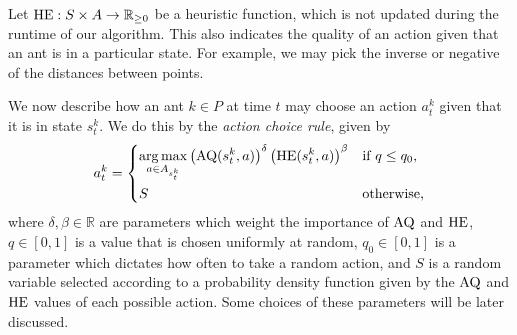 Let $\operatorname{HE}: S \times A \to \mathbb R_{\geq 0}$ be a heuristic function, which is not updated during the runtime of our algorithm. This also indicates the quality of an action given that an ant is in a particular state. For example, we may pick the inverse or negative of the distances between points.

We now describe how an ant $k \in P$ at time $t$ may choose an action $a_t^k$ given that it is in state $s_t^k$. We do this by the \emph{action choice rule}, given by
\begin{equation}
    \label{eq:action-choice-rule}
    a_t^k =
    \begin{dcases}
        \operatorname*{arg\,max}_{a \in A_{s_t^k}} \left(
        \operatorname{AQ}(s_t^k, a)
        \right)^\delta \left(
        \operatorname{HE}(s_t^k, a)
        \right)^\beta & \text{if $q \leq q_0$,} \\
        S             & \text{otherwise,}
    \end{dcases}
\end{equation}
where $\delta, \beta \in \mathbb R$ are parameters which weight the importance of $\operatorname{AQ}$ and $\operatorname{HE}$, $q \in [0,1]$ is a value that is chosen uniformly at random, $q_0 \in [0,1]$ is a parameter which dictates how often to take a random action, and $S$ is a random variable selected according to a probability density function given by the $\operatorname{AQ}$ and $\operatorname{HE}$ values of each possible action. Some choices of these parameters will be later discussed. 

